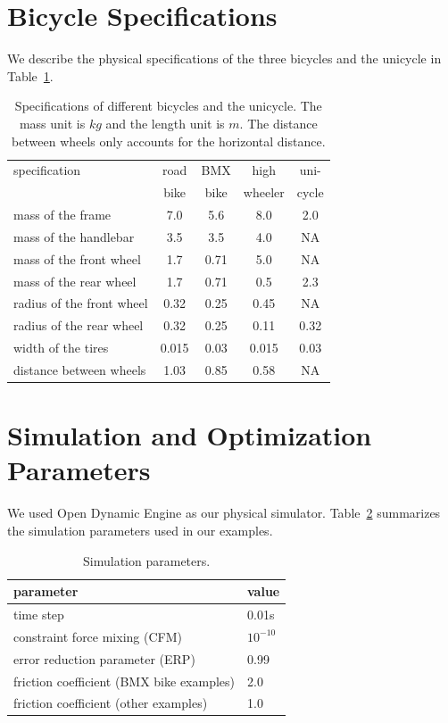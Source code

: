 \section{Bicycle Specifications}
We describe the physical specifications of the three bicycles and the unicycle in Table~\ref{table:specification}.

\begin{table}[!b]
\vspace{-0.1in}
\centering
\caption{Specifications of different bicycles and the unicycle. The mass unit is $kg$ and the length unit is $m$. The distance between wheels only accounts for the horizontal distance. }
\begin{tabular}{|l|c|c|c|c|}
\hline
specification & road & BMX  & high    & uni- \\
              & bike & bike & wheeler & cycle \\
\hline
mass of the frame & 7.0 & 5.6 & 8.0 & 2.0 \\
mass of the handlebar & 3.5 & 3.5 & 4.0 & NA \\
mass of the front wheel & 1.7 & 0.71 & 5.0 & NA \\
mass of the rear wheel &  1.7 & 0.71 & 0.5 & 2.3 \\
radius of the front wheel & 0.32 & 0.25 & 0.45 & NA  \\
radius of the rear wheel & 0.32 & 0.25 & 0.11 & 0.32  \\
width of the tires & 0.015 & 0.03 & 0.015 & 0.03 \\
distance between wheels & 1.03 & 0.85 & 0.58 & NA\\
\hline
\end{tabular}
\label{table:specification}
\end{table}

\section{Simulation and Optimization Parameters}
We used Open Dynamic Engine as our physical simulator. Table~\ref{table:simParameters} summarizes the simulation parameters used in our examples.

\begin{table}[ht]
\vspace{-0.1in}
\centering
\caption{Simulation parameters. }
\begin{tabular}{|l|l|}
\hline
parameter & value \\
\hline
time step & 0.01s \\
constraint force mixing (CFM) & $10^{-10}$ \\
error reduction parameter (ERP) & 0.99 \\
friction coefficient (BMX bike examples) & 2.0 \\
friction coefficient (other examples) & 1.0  \\
\hline
\end{tabular}
\label{table:simParameters}
\end{table}

